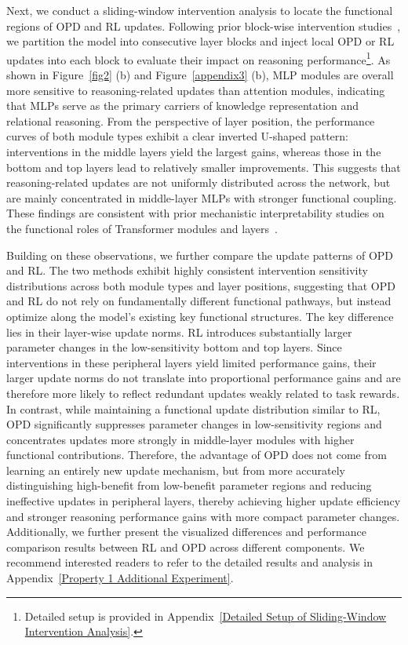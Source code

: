 \documentclass{article}
\begin{document}
Next, we conduct a sliding-window intervention analysis to locate the functional regions of OPD and RL updates. Following prior block-wise intervention studies~\citep{cai2024locatingmitigatinggenderbias, meng2023locatingeditingfactualassociations}, we partition the model into consecutive layer blocks and inject local OPD or RL updates into each block to evaluate their impact on reasoning performance\footnote{Detailed setup is provided in Appendix~\ref{Detailed Setup of Sliding-Window Intervention Analysis}.}. As shown in Figure~\ref{fig2} (b) and Figure~\ref{appendix3} (b), MLP modules are overall more sensitive to reasoning-related updates than attention modules, indicating that MLPs serve as the primary carriers of knowledge representation and relational reasoning. From the perspective of layer position, the performance curves of both module types exhibit a clear inverted U-shaped pattern: interventions in the middle layers yield the largest gains, whereas those in the bottom and top layers lead to relatively smaller improvements. This suggests that reasoning-related updates are not uniformly distributed across the network, but are mainly concentrated in middle-layer MLPs with stronger functional coupling. These findings are consistent with prior mechanistic interpretability studies on the functional roles of Transformer modules and layers~\citep{skean2025layer, geva2021transformerfeedforwardlayerskeyvalue, geva2022transformerfeedforwardlayersbuild}.

Building on these observations, we further compare the update patterns of OPD and RL. The two methods exhibit highly consistent intervention sensitivity distributions across both module types and layer positions, suggesting that OPD and RL do not rely on fundamentally different functional pathways, but instead optimize along the model's existing key functional structures. The key difference lies in their layer-wise update norms. RL introduces substantially larger parameter changes in the low-sensitivity bottom and top layers. Since interventions in these peripheral layers yield limited performance gains, their larger update norms do not translate into proportional performance gains and are therefore more likely to reflect redundant updates weakly related to task rewards. In contrast, while maintaining a functional update distribution similar to RL, OPD significantly suppresses parameter changes in low-sensitivity regions and concentrates updates more strongly in middle-layer modules with higher functional contributions. Therefore, the advantage of OPD does not come from learning an entirely new update mechanism, but from more accurately distinguishing high-benefit from low-benefit parameter regions and reducing ineffective updates in peripheral layers, thereby achieving higher update efficiency and stronger reasoning performance gains with more compact parameter changes. Additionally, we further present the visualized differences and performance comparison results between RL and OPD across different components. We recommend interested readers to refer to the detailed results and analysis in Appendix~\ref{Property 1 Additional Experiment}.
\end{document}

